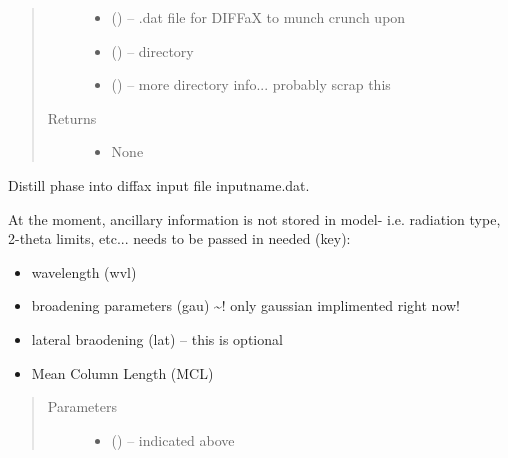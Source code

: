 \documentclass[letterpaper,10pt,english]{sphinxmanual}
\begin{document}
\begin{fulllineitems}
\begin{fulllineitems}
\begin{quote}
\begin{description}
\begin{itemize}
\item {} 
 (\sphinxstyleliteralemphasis{*}) -- .dat file for DIFFaX to munch crunch upon

\item {} 
 (\sphinxstyleliteralemphasis{*}) -- directory

\item {} 
 (\sphinxstyleliteralemphasis{*}) -- more directory info... probably scrap this

\end{itemize}

\item[{Returns}] \leavevmode
\begin{itemize}
\item {} 
None

\end{itemize}


\end{description}\end{quote}

\end{fulllineitems}


\begin{fulllineitems}
\label{\detokenize{rst/structure:mstack.structure.Phase.pub_input}}
Distill phase into diffax input file inputname.dat.

At the moment, ancillary information is not stored in model- i.e. radiation type,
2-theta limits, etc... needs to be passed in
needed (key):
\begin{itemize}
\item {} 
wavelength (wvl)

\item {} 
broadening parameters (gau) \textasciitilde{}! only gaussian implimented right now!

\item {} 
lateral braodening (lat) -- this is optional

\item {} 
Mean Column Length (MCL)

\end{itemize}
\begin{quote}\begin{description}
\item[{Parameters}] \leavevmode\begin{itemize}
\item {} 
 (\sphinxstyleliteralemphasis{*}) -- indicated above


\end{itemize}
\end{description}
\end{quote}
\end{fulllineitems}
\end{fulllineitems}
\end{document}
